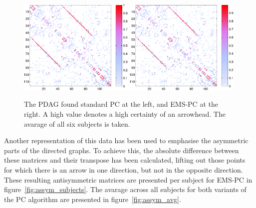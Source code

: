 \documentclass[a4paper, 10pt, english, onecolumn]{article}
\begin{document}
\begin{figure}[h!]
  \centering
  \includegraphics[width=0.49\textwidth]{images/new/PDAG_avg_mod-crop}
  \includegraphics[width=0.49\textwidth]{images/new/PDAG_avg_expl-crop}
  \caption{The PDAG found standard PC at the left, and EMS-PC at the right. A high value denotes a high certainty of an arrowhead. The avarage of all six subjects is taken.}
  \label{fig:pdag_avg}
\end{figure}

Another representation of this data has been used to emphasise the asymmetric parts of the directed graphs.
To achieve this, the absolute difference between these matrices and their transpose has been calculated, lifting out those points for which there is an arrow in one direction, but not in the opposite direction.
These resulting antisymmetric matrices are presented per subject for EMS-PC in figure~\ref{fig:assym_subjects}. The avarage across all subjects for both variants of the PC algorithm are presented in figure~\ref{fig:assym_avg}.
\end{document}
